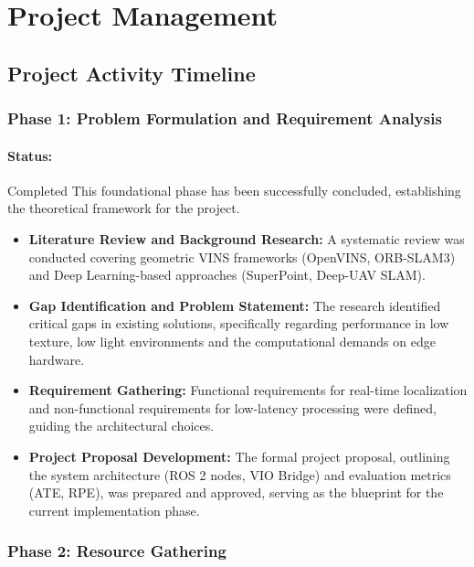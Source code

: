\section{Project Management}
\sloppy

\subsection{Project Activity Timeline}

\subsubsection{Phase 1: Problem Formulation and Requirement Analysis}
\paragraph{Status:}Completed
This foundational phase has been successfully concluded, establishing the theoretical framework for the project.
\begin{itemize}
    \item \textbf{Literature Review and Background Research:} A systematic review was conducted covering geometric VINS frameworks (OpenVINS, ORB-SLAM3) and Deep Learning-based approaches (SuperPoint, Deep-UAV SLAM).

    \item \textbf{Gap Identification and Problem Statement:} The research identified critical gaps in existing solutions, specifically regarding performance in low texture, low light environments and the computational demands on edge hardware.
    
    \item \textbf{Requirement Gathering:} Functional requirements for real-time localization and non-functional requirements for low-latency processing were defined, guiding the architectural choices.
    
    \item \textbf{Project Proposal Development:} The formal project proposal, outlining the system architecture (ROS 2 nodes, VIO Bridge) and evaluation metrics (ATE, RPE), was prepared and approved, serving as the blueprint for the current implementation phase.

\end{itemize}

\subsubsection{Phase 2: Resource Gathering}

